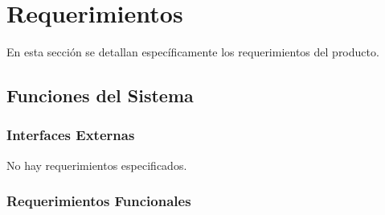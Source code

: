 \documentclass[12pt,a4paper,english,spanish]{article}
\begin{document}
\section{Requerimientos}
\label{section-req} 
En esta sección se detallan específicamente los requerimientos del producto. 

\subsection{Funciones del Sistema}

	\subsubsection{Interfaces Externas}
		No hay requerimientos especificados.
		
	\subsubsection{Requerimientos Funcionales}
\end{document}
